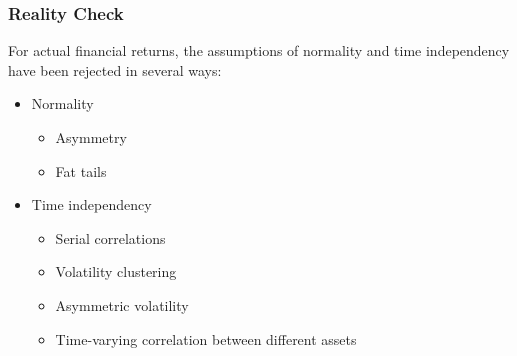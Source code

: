 \documentclass[xcolor=dvipsnames, english, 8pt]{beamer}
\begin{document}
\begin{frame}
    \frametitle{Reality Check}
For actual financial returns, the assumptions of normality and time independency have been rejected in several ways:\vspace{0.25cm}\\
\begin{itemize}
    \item Normality \begin{itemize}
            \item Asymmetry
            \item Fat tails
        \end{itemize}
    \item Time independency \begin{itemize}
            \item Serial correlations
            \item Volatility clustering
            \item Asymmetric volatility


            \item Time-varying correlation between different assets
        \end{itemize}
\end{itemize}
\end{frame}
\end{document}
